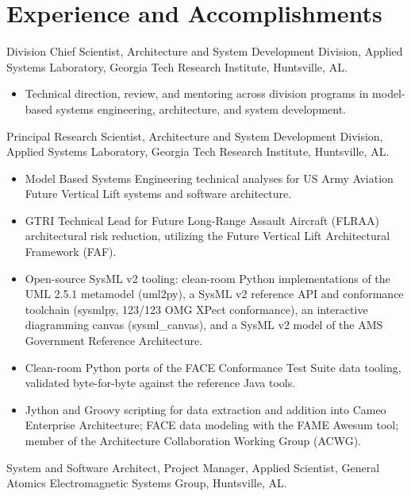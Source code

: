 \documentclass[american]{cv}
\begin{document}
\section{Experience and Accomplishments}

\begin{topic}

\item [January 2024 - Present] Division Chief Scientist, Architecture and
System Development Division, Applied Systems Laboratory, Georgia Tech
Research Institute, Huntsville, AL.

\begin{itemize}
\item Technical direction, review, and mentoring across division programs in
model-based systems engineering, architecture, and system development.
\end{itemize}

\item [September 2019 - Present] Principal Research Scientist, Architecture
and System Development Division, Applied Systems Laboratory, Georgia Tech
Research Institute, Huntsville, AL.

\begin{itemize}
\item Model Based Systems Engineering technical analyses for US Army Aviation
Future Vertical Lift systems and software architecture.
\item GTRI Technical Lead for Future Long-Range Assault Aircraft (FLRAA)
architectural risk reduction, utilizing the Future Vertical Lift
Architectural Framework (FAF).
\item Open-source SysML v2 tooling: clean-room Python implementations of the
UML 2.5.1 metamodel (uml2py), a SysML v2 reference API and conformance
toolchain (sysmlpy, 123/123 OMG XPect conformance), an interactive
diagramming canvas (sysml\_canvas), and a SysML v2 model of the AMS
Government Reference Architecture.
\item Clean-room Python ports of the FACE Conformance Test Suite data
tooling, validated byte-for-byte against the reference Java tools.
\item Jython and Groovy scripting for data extraction and addition into
Cameo Enterprise Architecture; FACE data modeling with the FAME Awesum tool;
member of the Architecture Collaboration Working Group (ACWG).
\end{itemize}

\item [March 2010 - August 2019] System and Software Architect, Project
Manager, Applied Scientist, General Atomics Electromagnetic Systems Group,
Huntsville, AL.


\end{topic}
\end{document}
